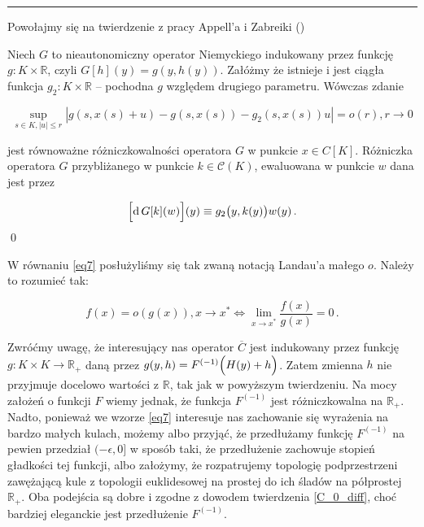 \hrule
\begin{dowod}\label{proof_diff_of_C_barred_in_C_0}   
\end{dowod}

Powołajmy się na twierdzenie z pracy Appell'a i Zabreiki (\citeyear[][twr. 6.7, str. 126]{Appell})

\begin{tw}\label{C_0_diff}

	Niech $G$ to nieautonomiczny operator Niemyckiego indukowany przez funkcję $g: K \times \mathbb{R}$, czyli $G[h](y) = g(y, h(y))$. Załóżmy że istnieje i jest ciągła funkcja $g_2: K \times \mathbb{R}$ -- pochodna $g$ względem drugiego parametru. Wówczas zdanie
	
\begin{equation}\label{eq7}
	\underset{s \in K, |u| \leq r}{\sup} |g(s,x(s)+u) - g(s, x(s)) - g_2 (s,x(s))u| = o(r), r \rightarrow 0 
\end{equation}
	
jest równoważne różniczkowalności operatora $G$	w punkcie $x \in C[K]$. Różniczka operatora $ G $ przybliżanego w punkcie $ k \in \mathcal{C}(K) $, ewaluowana w punkcie $ w $ dana jest przez

\begin{equation*}
	\Bigl[\mathrm{d}\, G[k](w)\Bigl] (y) \equiv g_2 \bigl(y, k(y)\bigl)w(y)\,.
\end{equation*}
\qed
\end{tw}

W równaniu \ref{eq7} posłużyliśmy się tak zwaną notacją Landau'a małego $o$. Należy to rozumieć tak:

\begin{equation*}
 f(x) = o(g(x)), x \rightarrow x^* \iff \underset{x \rightarrow x^*}{\lim} \frac{f(x)}{g(x)} = 0\,.
\end{equation*}

Zwróćmy uwagę, że interesujący nas operator $\overline{C}$ jest indukowany przez funkcję $g: K \times K \rightarrow \mathbb{R}_{+}$ daną przez $g(y, h) = F^{(-1)}\Bigl( H(y) + h \Bigl)$. Zatem zmienna $h$ nie przyjmuje docelowo wartości z $\mathbb{R}$, tak jak w powyższym twierdzeniu. Na mocy założeń o funkcji $F$ wiemy jednak, że funkcja $F^{(-1)}$ jest różniczkowalna na $\mathbb{R}_{+}$. Nadto, ponieważ we wzorze \ref{eq7} interesuje nas zachowanie się wyrażenia na bardzo małych kulach, możemy albo przyjąć, że przedłużamy funkcję $F^{(-1)}$ na pewien przedział $(-\epsilon,0]$ w sposób taki, że przedłużenie zachowuje stopień gładkości tej funkcji, albo założymy, że rozpatrujemy topologię podprzestrzeni zawężającą kule z topologii euklidesowej na prostej do ich śladów na półprostej $\mathbb{R}_{+}$. Oba podejścia są dobre i zgodne z dowodem twierdzenia \ref{C_0_diff}, choć bardziej eleganckie jest przedłużenie $F^{(-1)}$. 

